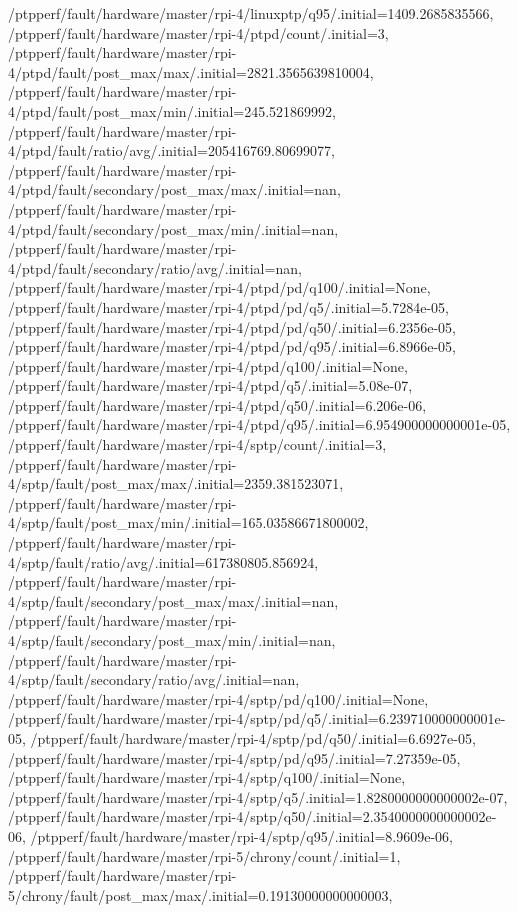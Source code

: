 {    /ptpperf/fault/hardware/master/rpi-4/linuxptp/q95/.initial=1409.2685835566,
    /ptpperf/fault/hardware/master/rpi-4/ptpd/count/.initial=3,
    /ptpperf/fault/hardware/master/rpi-4/ptpd/fault/post_max/max/.initial=2821.3565639810004,
    /ptpperf/fault/hardware/master/rpi-4/ptpd/fault/post_max/min/.initial=245.521869992,
    /ptpperf/fault/hardware/master/rpi-4/ptpd/fault/ratio/avg/.initial=205416769.80699077,
    /ptpperf/fault/hardware/master/rpi-4/ptpd/fault/secondary/post_max/max/.initial=nan,
    /ptpperf/fault/hardware/master/rpi-4/ptpd/fault/secondary/post_max/min/.initial=nan,
    /ptpperf/fault/hardware/master/rpi-4/ptpd/fault/secondary/ratio/avg/.initial=nan,
    /ptpperf/fault/hardware/master/rpi-4/ptpd/pd/q100/.initial=None,
    /ptpperf/fault/hardware/master/rpi-4/ptpd/pd/q5/.initial=5.7284e-05,
    /ptpperf/fault/hardware/master/rpi-4/ptpd/pd/q50/.initial=6.2356e-05,
    /ptpperf/fault/hardware/master/rpi-4/ptpd/pd/q95/.initial=6.8966e-05,
    /ptpperf/fault/hardware/master/rpi-4/ptpd/q100/.initial=None,
    /ptpperf/fault/hardware/master/rpi-4/ptpd/q5/.initial=5.08e-07,
    /ptpperf/fault/hardware/master/rpi-4/ptpd/q50/.initial=6.206e-06,
    /ptpperf/fault/hardware/master/rpi-4/ptpd/q95/.initial=6.954900000000001e-05,
    /ptpperf/fault/hardware/master/rpi-4/sptp/count/.initial=3,
    /ptpperf/fault/hardware/master/rpi-4/sptp/fault/post_max/max/.initial=2359.381523071,
    /ptpperf/fault/hardware/master/rpi-4/sptp/fault/post_max/min/.initial=165.03586671800002,
    /ptpperf/fault/hardware/master/rpi-4/sptp/fault/ratio/avg/.initial=617380805.856924,
    /ptpperf/fault/hardware/master/rpi-4/sptp/fault/secondary/post_max/max/.initial=nan,
    /ptpperf/fault/hardware/master/rpi-4/sptp/fault/secondary/post_max/min/.initial=nan,
    /ptpperf/fault/hardware/master/rpi-4/sptp/fault/secondary/ratio/avg/.initial=nan,
    /ptpperf/fault/hardware/master/rpi-4/sptp/pd/q100/.initial=None,
    /ptpperf/fault/hardware/master/rpi-4/sptp/pd/q5/.initial=6.239710000000001e-05,
    /ptpperf/fault/hardware/master/rpi-4/sptp/pd/q50/.initial=6.6927e-05,
    /ptpperf/fault/hardware/master/rpi-4/sptp/pd/q95/.initial=7.27359e-05,
    /ptpperf/fault/hardware/master/rpi-4/sptp/q100/.initial=None,
    /ptpperf/fault/hardware/master/rpi-4/sptp/q5/.initial=1.8280000000000002e-07,
    /ptpperf/fault/hardware/master/rpi-4/sptp/q50/.initial=2.3540000000000002e-06,
    /ptpperf/fault/hardware/master/rpi-4/sptp/q95/.initial=8.9609e-06,
    /ptpperf/fault/hardware/master/rpi-5/chrony/count/.initial=1,
    /ptpperf/fault/hardware/master/rpi-5/chrony/fault/post_max/max/.initial=0.19130000000000003,
}
